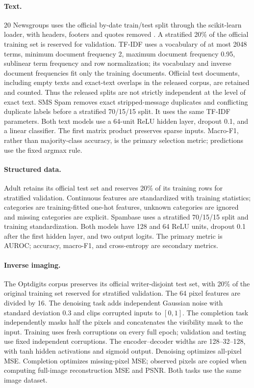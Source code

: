 \paragraph{Text.}
20 Newsgroups uses the official by-date train/test split through the
scikit-learn loader, with headers, footers and quotes removed
\cite{sklearn20newsdata}. A stratified 20\% of the official training set is
reserved for validation. TF-IDF uses a vocabulary of at most 2048 terms,
minimum document frequency 2, maximum document frequency 0.95, sublinear
term frequency and row normalization; its vocabulary and inverse document
frequencies fit only the training documents. Official test documents,
including empty texts and exact-text overlaps in the released corpus, are
retained and counted. Thus the released splits are not strictly independent
at the level of exact text. SMS Spam \cite{uci2011sms} removes exact stripped-message duplicates
and conflicting duplicate labels before a stratified 70/15/15 split. It uses
the same TF-IDF parameters. Both text models use a 64-unit ReLU hidden layer,
dropout 0.1, and a linear classifier. The first matrix product preserves sparse inputs. Macro-F1, rather than majority-class accuracy, is the primary
selection metric; predictions use the fixed argmax rule.

\paragraph{Structured data.}
Adult \cite{uci1996adult} retains its official test set and reserves 20\% of
its training rows for stratified validation. Continuous features are
standardized with training statistics; categories are training-fitted one-hot
features, unknown categories are ignored and missing categories are explicit.
Spambase \cite{uci1999spambase} uses a stratified 70/15/15 split and training
standardization. Both models have 128 and 64 ReLU units, dropout 0.1 after
the first hidden layer, and two output logits. The primary metric is AUROC;
accuracy, macro-F1, and cross-entropy are secondary metrics.

\paragraph{Inverse imaging.}
The Optdigits corpus \cite{uci1998optdigits} preserves its official
writer-disjoint test set, with 20\% of the original training set reserved
for stratified validation. The 64 pixel features are divided by 16. The
denoising task adds independent Gaussian noise with standard deviation 0.3
and clips corrupted inputs to $[0,1]$. The completion task independently
masks half the pixels and concatenates the visibility mask to the input.
Training uses fresh corruptions on every full epoch; validation and testing
use fixed independent corruptions. The encoder--decoder widths are
128--32--128, with tanh hidden activations and sigmoid output. Denoising
optimizes all-pixel MSE. Completion optimizes missing-pixel MSE; observed
pixels are copied when computing full-image reconstruction MSE and PSNR.
Both tasks use the same image dataset.

